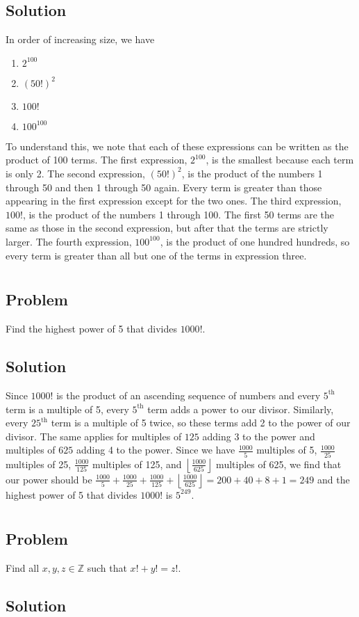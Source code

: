 \documentclass[12pt]{article}
\newcommand{\floor}[1]{\left\lfloor #1 \right\rfloor}
\newcommand{\Z}    [0]{\mathbb{Z}                   }
\begin{document}
\subsection{Solution}
In order of increasing size, we have
\begin{enumerate}
    \item $2^{100}$
    \item $(50!)^2$
    \item $100!$
    \item $100^{100}$
\end{enumerate}
To understand this, we note that each of these expressions can be written as the product of 100 terms. The first expression, $2^{100}$, is the smallest because each term is only 2. The second expression, $(50!)^2$, is the product of the numbers 1 through 50 and then 1 through 50 again. Every term is greater than those appearing in the first expression except for the two ones. The third expression, $100!$, is the product of the numbers 1 through 100. The first 50 terms are the same as those in the second expression, but after that the terms are strictly larger. The fourth expression, $100^{100}$, is the product of one hundred hundreds, so every term is greater than all but one of the terms in expression three.



\section{}

\subsection{Problem}
Find the highest power of 5 that divides $1000!$.

\subsection{Solution}
Since $1000!$ is the product of an ascending sequence of numbers and every $5^\text{th}$ term is a multiple of 5, every $5^\text{th}$ term adds a power to our divisor. Similarly, every $25^\text{th}$ term is a multiple of 5 twice, so these terms add 2 to the power of our divisor. The same applies for multiples of $125$ adding 3 to the power and multiples of $625$ adding 4 to the power. Since we have $\frac{1000}{5}$ multiples of 5, $\frac{1000}{25}$ multiples of 25, $\frac{1000}{125}$ multiples of 125, and $\floor{\frac{1000}{625}}$ multiples of 625, we find that our power should be $\frac{1000}{5} + \frac{1000}{25} + \frac{1000}{125} + \floor{\frac{1000}{625}} = 200 + 40 + 8 + 1 = 249$ and the highest power of 5 that divides $1000!$ is $\boxed{5^{249}}$.



\section{}

\subsection{Problem}
Find all $x, y, z \in \Z$ such that $x! + y! = z!$.

\subsection{Solution}
\end{document}
